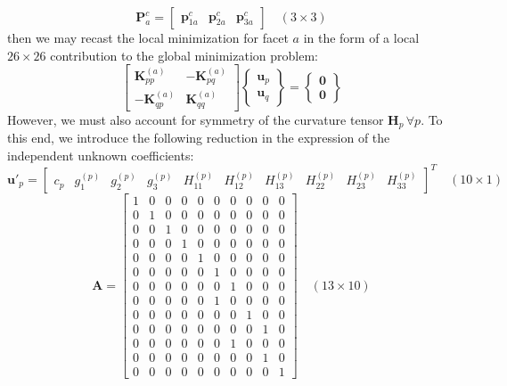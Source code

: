 \documentclass[11pt]{article} %
\begin{document}
\begin{equation}
	\mathbf{P}^c_a = \left[ \begin{array}{ccc} \mathbf{p}^c_{1a} & \mathbf{p}^c_{2a} & \mathbf{p}^c_{3a} \end{array} \right] \quad (3 \times 3)
\end{equation}
then we may recast the local minimization for facet $a$ in the form of a local $26\times26$ contribution to the global minimization problem:
\begin{equation}
	\left[ \begin{array}{cc} \mathbf{K}_{pp}^{(a)} & -\mathbf{K}_{pq}^{(a)} \\ -\mathbf{K}_{qp}^{(a)} & \mathbf{K}_{qq}^{(a)} \end{array} \right] \left\{ \begin{array}{c} \mathbf{u}_p \\ \mathbf{u}_q \end{array} \right\} = \left\{ \begin{array}{c} \mathbf{0} \\ \mathbf{0} \end{array} \right\}
\end{equation}
However, we must also account for symmetry of the curvature tensor $\mathbf{H}_p \, \forall p$. To this end, we introduce the following reduction in the expression of the independent unknown coefficients:
\begin{equation}
	\mathbf{u}'_p =  \left[ \begin{array}{cccccccccc} c_p & g^{(p)}_{1} & g^{(p)}_{2} & g^{(p)}_{3} & H^{(p)}_{11} & H^{(p)}_{12} & H^{(p)}_{13} & H^{(p)}_{22} & H^{(p)}_{23} & H^{(p)}_{33} \end{array} \right]^T \quad (10 \times 1)
\end{equation}
\begin{equation}
	\mathbf{A} =  \left[ \begin{array}{cccccccccc} 1 & 0 & 0 & 0 & 0 & 0 & 0 & 0 & 0 & 0 \\ 0 & 1 & 0 & 0 & 0 & 0 & 0 & 0 & 0 & 0 \\ 0 & 0 & 1 & 0 & 0 & 0 & 0 & 0 & 0 & 0 \\ 0 & 0 & 0 & 1 & 0 & 0 & 0 & 0 & 0 & 0 \\ 0 & 0 & 0 & 0 & 1 & 0 & 0 & 0 & 0 & 0 \\ 0 & 0 & 0 & 0 & 0 & 1 & 0 & 0 & 0 & 0 \\ 0 & 0 & 0 & 0 & 0 & 0 & 1 & 0 & 0 & 0 \\ 0 & 0 & 0 & 0 & 0 & 1 & 0 & 0 & 0 & 0 \\ 0 & 0 & 0 & 0 & 0 & 0 & 0 & 1 & 0 & 0 \\ 0 & 0 & 0 & 0 & 0 & 0 & 0 & 0 & 1 & 0 \\ 0 & 0 & 0 & 0 & 0 & 0 & 1 & 0 & 0 & 0 \\ 0 & 0 & 0 & 0 & 0 & 0 & 0 & 0 & 1 & 0 \\ 0 & 0 & 0 & 0 & 0 & 0 & 0 & 0 & 0 & 1 \end{array} \right] \quad (13 \times 10)
\end{equation}
\end{document}
